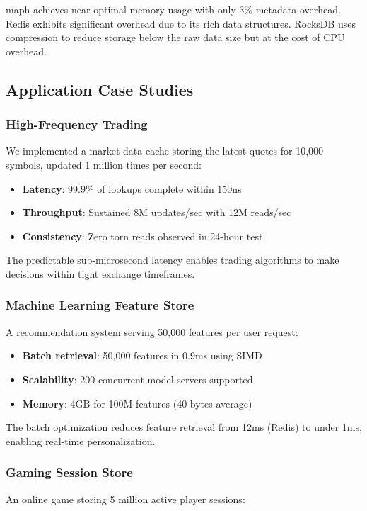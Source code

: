 \documentclass[10pt,conference]{IEEEtran}
\begin{document}
maph achieves near-optimal memory usage with only 3\% metadata overhead. Redis exhibits significant overhead due to its rich data structures. RocksDB uses compression to reduce storage below the raw data size but at the cost of CPU overhead.

\subsection{Application Case Studies}

\subsubsection{High-Frequency Trading}
We implemented a market data cache storing the latest quotes for 10,000 symbols, updated 1 million times per second:

\begin{itemize}
\item \textbf{Latency}: 99.9\% of lookups complete within 150ns
\item \textbf{Throughput}: Sustained 8M updates/sec with 12M reads/sec
\item \textbf{Consistency}: Zero torn reads observed in 24-hour test
\end{itemize}

The predictable sub-microsecond latency enables trading algorithms to make decisions within tight exchange timeframes.

\subsubsection{Machine Learning Feature Store}
A recommendation system serving 50,000 features per user request:

\begin{itemize}
\item \textbf{Batch retrieval}: 50,000 features in 0.9ms using SIMD
\item \textbf{Scalability}: 200 concurrent model servers supported
\item \textbf{Memory}: 4GB for 100M features (40 bytes average)
\end{itemize}

The batch optimization reduces feature retrieval from 12ms (Redis) to under 1ms, enabling real-time personalization.

\subsubsection{Gaming Session Store}
An online game storing 5 million active player sessions:
\end{document}
